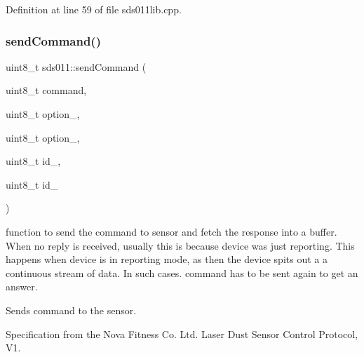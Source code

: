 Definition at line 59 of file sds011lib.\+cpp.

\mbox{\label{classsds011_aff3c41586a6f4ac084edfb0da0f05c40}} 
\subsubsection{\texorpdfstring{sendCommand()}{sendCommand()}}
{\footnotesize\ttfamily uint8\+\_\+t sds011\+::send\+Command (\begin{DoxyParamCaption}\item[{uint8\+\_\+t}]{command,  }\item[{uint8\+\_\+t}]{option\+\_,  }\item[{uint8\+\_\+t}]{option\+\_,  }\item[{uint8\+\_\+t}]{id\+\_,  }\item[{uint8\+\_\+t}]{id\+\_ }\end{DoxyParamCaption})\hspace{0.3cm}{\ttfamily [private]}}



function to send the command to sensor and fetch the response into a buffer. When no reply is received, usually this is because device was just reporting. This happens when device is in reporting mode, as then the device spits out a a continuous stream of data. In such cases. command has to be sent again to get an answer. 

Sends command to the sensor.

Specification from the Nova Fitness Co. Ltd. Laser Dust Sensor Control Protocol, V1.

